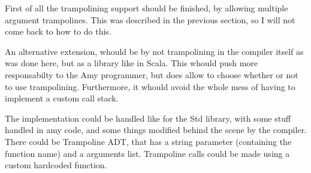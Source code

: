 First of all the trampolining support should be finished, by allowing multiple argument trampolines. This was described in the previous section, so I will not come back to how to do this.

An alternative extension, whould be by not trampolining in the compiler itself as was done here, but as a library like in Scala. This whould push more responsabilty to the Amy programmer, but does allow to choose whether or not to use trampolining. Furthermore, it whould avoid the whole mess of having to implement a custom call stack. 

The implementation could be handled like for the Std library, with some stuff handled in amy code, and some things modified behind the scene by the compiler. There could be Trampoline ADT, that has a string parameter (containing the function name) and a arguments list. Trampoline calls could be made using a custom hardcoded function.


